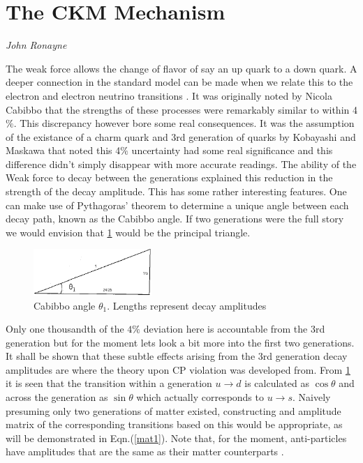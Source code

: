 %
\section{The CKM Mechanism}
\vspace{-1.0em}
\begin{center}
\tiny{\textit{John Ronayne}}
\end{center}

The weak force allows the change of flavor of say an up quark to a down quark. A deeper connection in the standard model can be made when we relate this to the electron and electron neutrino transitions \cite{CKM8}. It was originally noted by Nicola Cabibbo that the strengths of these processes were remarkably similar to within 4$\%$. This discrepancy however bore some real consequences. It was the assumption of the existance of a charm quark and 3rd generation of quarks by Kobayashi and Maskawa that noted this 4$\%$ uncertainty had some real significance and this difference didn't simply disappear with more accurate readings. The ability of the Weak force to decay between the generations explained this reduction in the strength of the decay amplitude. This has some rather interesting features. One can make use of Pythagoras' theorem to determine a unique angle between each decay path, known as the Cabibbo angle. If two generations were the full story we would envision that \cref{cabibbo} would be the principal triangle.

\begin{figure}[h]
\centering
\includegraphics[angle=1, width=0.4\textwidth]{figs/ckmfig1.jpg}
\caption{Cabibbo angle $\theta_1$. Lengths represent decay amplitudes}
\label{cabibbo}
\end{figure}

Only one thousandth of the $4\%$ deviation here is accountable from the 3rd generation but for the moment lets look a bit more into the first two generations.
It shall be shown that these subtle effects arising from the 3rd generation decay amplitudes are where the theory upon CP violation was developed from. From \cref{cabibbo} it is seen that the transition within a generation $u\rightarrow d$ is calculated as $\cos\theta$ and across the generation as $\sin\theta$ which actually corresponds to $u\rightarrow s$. Naively presuming only two generations of matter existed, constructing and amplitude matrix of the corresponding transitions based on this would be appropriate, as will be demonstrated in Eqn.(\ref{mat1}). Note that, for the moment, anti-particles have amplitudes that are the same as their matter counterparts \cite{CKM1}.

